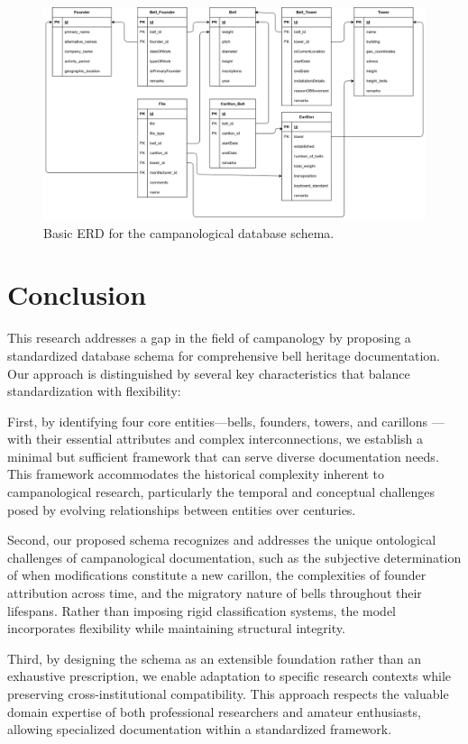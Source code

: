 \documentclass[11pt, a4paper]{article}
\begin{document}
\begin{figure}[h!]
    \centering
    \includegraphics[width=1\textwidth]{images/basic_erd.png}
    \caption{Basic ERD for the campanological database schema.}
    \label{fig:basic-erd}
\end{figure}

\section{Conclusion}

This research addresses a gap in the field of campanology by proposing a standardized database schema for comprehensive bell heritage documentation. Our approach is distinguished by several key characteristics that balance standardization with flexibility:

First, by identifying four core entities—bells, founders, towers, and carillons — with their essential attributes and complex interconnections, we establish a minimal but sufficient framework that can serve diverse documentation needs. This framework accommodates the historical complexity inherent to campanological research, particularly the temporal and conceptual challenges posed by evolving relationships between entities over centuries.

Second, our proposed schema recognizes and addresses the unique ontological challenges of campanological documentation, such as the subjective determination of when modifications constitute a new carillon, the complexities of founder attribution across time, and the migratory nature of bells throughout their lifespans. Rather than imposing rigid classification systems, the model incorporates flexibility while maintaining structural integrity.

Third, by designing the schema as an extensible foundation rather than an exhaustive prescription, we enable adaptation to specific research contexts while preserving cross-institutional compatibility. This approach respects the valuable domain expertise of both professional researchers and amateur enthusiasts, allowing specialized documentation within a standardized framework.
\end{document}
